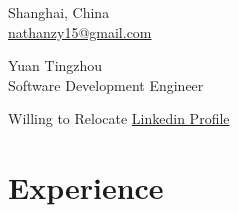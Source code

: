 \documentclass[a4,10pt]{article}
\newcommand{\hskills}[1]{
\textbf{\bfseries #1} }
\begin{document}
\begin{center}
    \begin{minipage}[b]{0.24\textwidth}
            \large Shanghai, China \\
            \large \href{mailto:nathanzy15@gmail.com}{nathanzy15@gmail.com} 
    \end{minipage}%
    \begin{minipage}[b]{0.5\textwidth}
            \centering
            {\HUGE Yuan Tingzhou} \\ %
            \vspace{0.1cm}
            {\color{UI_blue} \Large{Software Development Engineer}} \\
    \end{minipage}%
    \begin{minipage}[b]{0.24\textwidth}
            \flushright \large  Willing to Relocate
            {\href{https://www.linkedin.com/in/tingzhou-yuan-aa7718214/}{Linkedin Profile} } \\
    \end{minipage}   
    
\vspace{-0.15cm} 
{\color{UI_blue} \hrulefill}
\end{center}
\vspace{-0.2cm}
\section{Experience}

        
\end{document}
